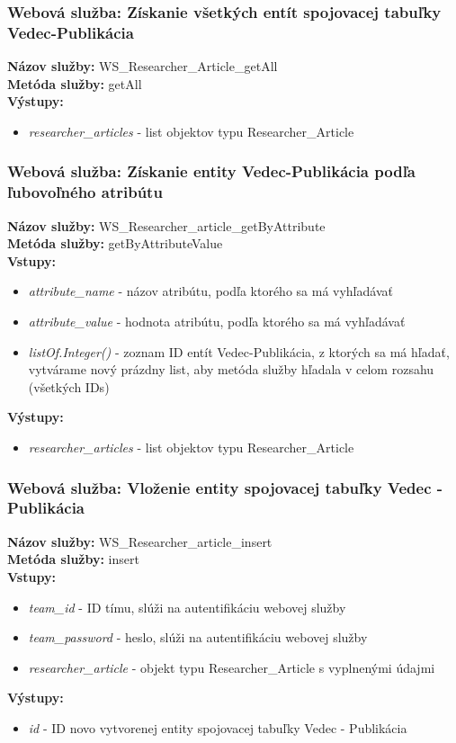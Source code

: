 \documentclass[10pt,oneside,slovak,a4paper]{article}
\begin{document}
\subsubsection{Webová služba: Získanie všetkých entít spojovacej tabuľky Vedec-Publikácia}
\textbf{Názov služby:} WS\_Researcher\_Article\_getAll\\
\textbf{Metóda služby:} getAll\\
\textbf{Výstupy:}
	\begin{itemize}
		\item \textit{researcher\_articles} - list objektov typu Researcher\_Article
	\end{itemize}
	
\subsubsection{Webová služba: Získanie entity Vedec-Publikácia podľa ľubovoľného atribútu}
\textbf{Názov služby:} WS\_Researcher\_article\_getByAttribute\\
\textbf{Metóda služby:} getByAttributeValue\\
\textbf{Vstupy:}
	\begin{itemize}
		\item \textit{attribute\_name} - názov atribútu, podľa ktorého sa má vyhľadávať
		\item \textit{attribute\_value} - hodnota atribútu, podľa ktorého sa má vyhľadávať
		\item \textit{listOf.Integer()} - zoznam ID entít Vedec-Publikácia, z ktorých sa má hľadať, vytvárame nový prázdny list, aby metóda služby hľadala v celom rozsahu (všetkých IDs)
	\end{itemize}
\textbf{Výstupy:}
	\begin{itemize}
		\item \textit{researcher\_articles} - list objektov typu Researcher\_Article
	\end{itemize}
	
\subsubsection{Webová služba: Vloženie entity spojovacej tabuľky Vedec - Publikácia}
\textbf{Názov služby:} WS\_Researcher\_article\_insert\\
\textbf{Metóda služby:} insert\\
\textbf{Vstupy:}
	\begin{itemize}
		\item \textit{team\_id} - ID tímu, slúži na autentifikáciu webovej služby
		\item \textit{team\_password} - heslo, slúži na autentifikáciu webovej služby
		\item \textit{researcher\_article} - objekt typu Researcher\_Article s vyplnenými údajmi
	\end{itemize}
\textbf{Výstupy:}
	\begin{itemize}
		\item \textit{id} - ID novo vytvorenej entity spojovacej tabuľky Vedec - Publikácia
	\end{itemize}
\end{document}
